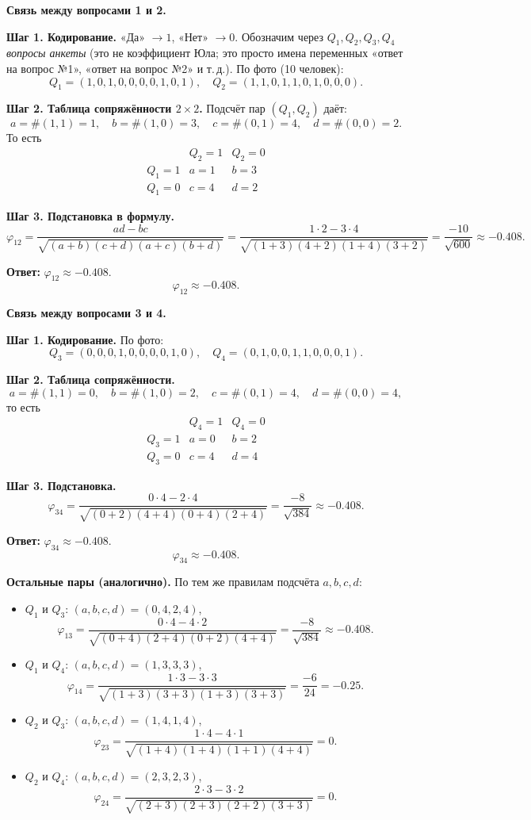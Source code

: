 \documentclass[12pt,a4paper]{article}
\begin{document}
\begin{enumerate}[label=\textbf{\arabic*.}]
\textbf{Связь между вопросами 1 и 2.}

\textbf{Шаг 1. Кодирование.} «Да» $\to 1$, «Нет» $\to 0$. Обозначим через $Q_1,Q_2,Q_3,Q_4$ \emph{вопросы анкеты} (это не коэффициент Юла; это просто имена переменных «ответ на вопрос №1», «ответ на вопрос №2» и т.\,д.). По фото (10 человек):
\[
Q_1=(1,0,1,0,0,0,0,1,0,1),\quad
Q_2=(1,1,0,1,1,0,1,0,0,0).
\]

\textbf{Шаг 2. Таблица сопряжённости $2\times2$.}
Подсчёт пар $(Q_1,Q_2)$ даёт:
\[
a=\#(1,1)=1,\quad b=\#(1,0)=3,\quad c=\#(0,1)=4,\quad d=\#(0,0)=2.
\]
То есть
\[
\begin{array}{c|cc}
 & Q_2=1 & Q_2=0\\ \hline
Q_1=1 & a=1 & b=3\\
Q_1=0 & c=4 & d=2
\end{array}
\]

\textbf{Шаг 3. Подстановка в формулу.}
\[
\varphi_{12}=\frac{ad-bc}{\sqrt{(a+b)(c+d)(a+c)(b+d)}}
=\frac{1\cdot2-3\cdot4}{\sqrt{(1+3)(4+2)(1+4)(3+2)}}
=\frac{-10}{\sqrt{600}}
\approx -0.408.
\]

\textbf{Ответ:} $\varphi_{12}\approx -0.408$.
\[
\varphi_{12}\approx -0.408.
\]

\textbf{Связь между вопросами 3 и 4.}

\textbf{Шаг 1. Кодирование.} По фото:
\[
Q_3=(0,0,0,1,0,0,0,0,1,0),\quad
Q_4=(0,1,0,0,1,1,0,0,0,1).
\]

\textbf{Шаг 2. Таблица сопряжённости.}
\[
a=\#(1,1)=0,\quad b=\#(1,0)=2,\quad c=\#(0,1)=4,\quad d=\#(0,0)=4,
\]
то есть
\[
\begin{array}{c|cc}
 & Q_4=1 & Q_4=0\\ \hline
Q_3=1 & a=0 & b=2\\
Q_3=0 & c=4 & d=4
\end{array}
\]

\textbf{Шаг 3. Подстановка.}
\[
\varphi_{34}=\frac{0\cdot4-2\cdot4}{\sqrt{(0+2)(4+4)(0+4)(2+4)}}
=\frac{-8}{\sqrt{384}}
\approx -0.408.
\]

\textbf{Ответ:} $\varphi_{34}\approx -0.408$.
\[
\varphi_{34}\approx -0.408.
\]

\textbf{Остальные пары (аналогично).} По тем же правилам подсчёта $a,b,c,d$:
\begin{itemize}
\item $Q_1$ и $Q_3$: $(a,b,c,d)=(0,4,2,4)$,
\[
\varphi_{13}=\frac{0\cdot4-4\cdot2}{\sqrt{(0+4)(2+4)(0+2)(4+4)}}=\frac{-8}{\sqrt{384}}\approx -0.408.
\]
\item $Q_1$ и $Q_4$: $(a,b,c,d)=(1,3,3,3)$,
\[
\varphi_{14}=\frac{1\cdot3-3\cdot3}{\sqrt{(1+3)(3+3)(1+3)(3+3)}}=\frac{-6}{24}=-0.25.
\]
\item $Q_2$ и $Q_3$: $(a,b,c,d)=(1,4,1,4)$,
\[
\varphi_{23}=\frac{1\cdot4-4\cdot1}{\sqrt{(1+4)(1+4)(1+1)(4+4)}}=0.
\]
\item $Q_2$ и $Q_4$: $(a,b,c,d)=(2,3,2,3)$,
\[
\varphi_{24}=\frac{2\cdot3-3\cdot2}{\sqrt{(2+3)(2+3)(2+2)(3+3)}}=0.
\]
\end{itemize}


\end{enumerate}
\end{document}
